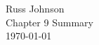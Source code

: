 \documentclass[12pt]{article}
\begin{document}
\begin{flushright}
Russ Johnson\\
Chapter 9 Summary\\
\today\\
\end{flushright}
\end{document}
